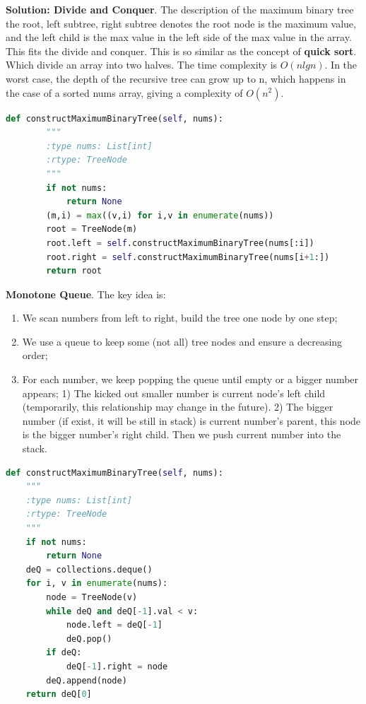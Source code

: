\documentclass[../main.tex]{subfiles}
\begin{document}
\begin{examples}[resume]
\begin{lstlisting}[numbers=none]
\end{lstlisting}
\textbf{Solution: Divide and Conquer}. The description of the maximum binary tree the root, left subtree, right subtree denotes the root node is the maximum value, and the left child is the max value in the left side of the max value in the array. This fits the divide and conquer. This is so similar as the concept of \textbf{quick sort}. Which divide an array into two halves. The time complexity is $O(nlgn)$. In the worst case, the depth of the recursive tree can grow up to n, which happens in the case of a sorted nums array, giving a complexity of $O(n^2)$.
\begin{lstlisting}[language=Python]
 def constructMaximumBinaryTree(self, nums):
        """
        :type nums: List[int]
        :rtype: TreeNode
        """
        if not nums:
            return None
        (m,i) = max((v,i) for i,v in enumerate(nums)) 
        root = TreeNode(m)
        root.left = self.constructMaximumBinaryTree(nums[:i])
        root.right = self.constructMaximumBinaryTree(nums[i+1:])
        return root
\end{lstlisting}
\textbf{Monotone Queue}. The key idea is:
\begin{enumerate}
    \item We scan numbers from left to right, build the tree one node by one step;
    \item We use a queue to keep some (not all) tree nodes and ensure a decreasing order;
    \item For each number, we keep popping the queue until empty or a bigger number appears; 1) The kicked out smaller number is current node's left child (temporarily, this relationship may change in the future). 2) The bigger number (if exist, it will be still in stack) is current number's parent, this node is the bigger number's right child.  Then we push current number into the stack.
\end{enumerate}
\begin{lstlisting}[language=Python]
def constructMaximumBinaryTree(self, nums):
    """
    :type nums: List[int]
    :rtype: TreeNode
    """
    if not nums:
        return None
    deQ = collections.deque()
    for i, v in enumerate(nums):
        node = TreeNode(v)
        while deQ and deQ[-1].val < v:
            node.left = deQ[-1]
            deQ.pop()
        if deQ:
            deQ[-1].right = node
        deQ.append(node)
    return deQ[0]
\end{lstlisting}
\end{examples}
\end{document}
